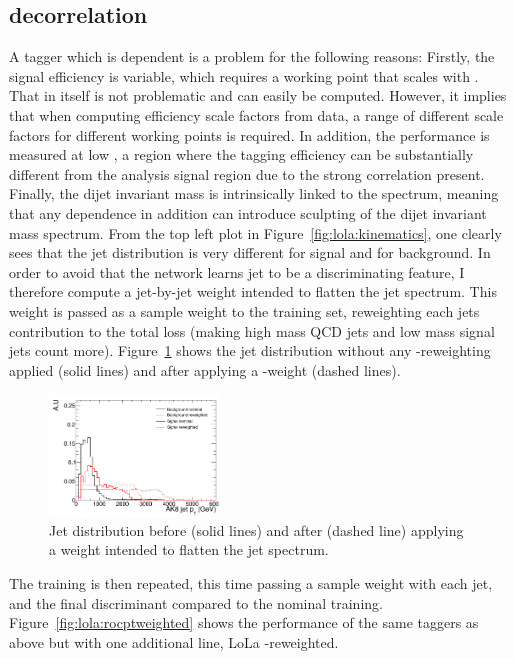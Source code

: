 \subsection{\PT decorrelation}
A tagger which is \PT dependent is a problem for the following reasons: Firstly, the signal efficiency is variable, which requires a working point that scales with \PT. That in itself is not problematic and can easily be computed. However, it implies that when computing efficiency scale factors from data, a range of different scale factors for different working points is required. In addition, the performance is measured at low \PT, a region where the tagging efficiency can be substantially different from the analysis signal region due to the strong \PT correlation present. Finally, the dijet invariant mass is intrinsically linked to the \PT spectrum, meaning that any \PT dependence in addition can introduce sculpting of the dijet invariant mass spectrum.\newline
From the top left plot in Figure~\ref{fig:lola:kinematics}, one clearly sees that the jet \PT distribution is very different for signal and for background. In order to avoid that the network learns jet \PT to be a discriminating feature, I therefore compute a jet-by-jet weight intended to flatten the jet \PT spectrum. This weight is passed as a sample weight to the training set, reweighting each jets contribution to the total loss (making high mass QCD jets and low mass signal jets count more). Figure~\ref{fig:lola:ptweight} shows the jet \PT distribution without any \PT-reweighting applied (solid lines) and after applying a \PT-weight (dashed lines).
\begin{figure}[h!]
\centering
\includegraphics[width=0.4\textwidth]{figures/vtagging/AN-18-099/input/pt_reweighted/postWeight.png}
\caption{Jet \PT distribution before (solid lines) and after (dashed line) applying a weight intended to flatten the jet \PT spectrum.}
\label{fig:lola:ptweight}
\end{figure}
The training is then repeated, this time passing a sample weight with each jet, and the final discriminant compared to the nominal training. Figure~\ref{fig:lola:rocptweighted} shows the performance of the same taggers as above but with one additional line, LoLa \PT-reweighted.
